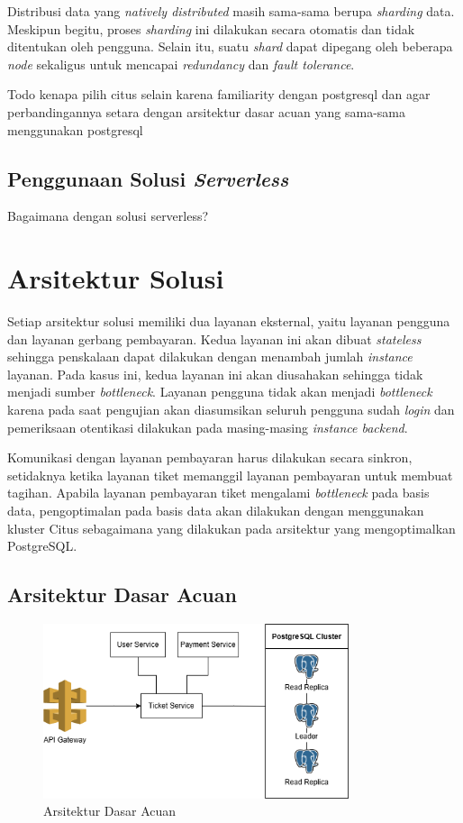 Distribusi data yang \textit{natively distributed} masih sama-sama berupa \textit{sharding} data. Meskipun begitu, proses \textit{sharding} ini dilakukan secara otomatis dan tidak ditentukan oleh pengguna. Selain itu, suatu \textit{shard} dapat dipegang oleh beberapa \textit{node} sekaligus untuk mencapai \textit{redundancy} dan \textit{fault tolerance}.

Todo kenapa pilih citus selain karena familiarity dengan postgresql dan agar perbandingannya setara dengan arsitektur dasar acuan yang sama-sama menggunakan postgresql

\subsection{Penggunaan Solusi \textit{Serverless}}

Bagaimana dengan solusi serverless?

\section{Arsitektur Solusi}

Setiap arsitektur solusi memiliki dua layanan eksternal, yaitu layanan pengguna dan layanan gerbang pembayaran. Kedua layanan ini akan dibuat \textit{stateless} sehingga penskalaan dapat dilakukan dengan menambah jumlah \textit{instance} layanan. Pada kasus ini, kedua layanan ini akan diusahakan sehingga tidak menjadi sumber \textit{bottleneck}. Layanan pengguna tidak akan menjadi \textit{bottleneck} karena pada saat pengujian akan diasumsikan seluruh pengguna sudah \textit{login} dan pemeriksaan otentikasi dilakukan pada masing-masing \textit{instance backend}.

Komunikasi dengan layanan pembayaran harus dilakukan secara sinkron, setidaknya ketika layanan tiket memanggil layanan pembayaran untuk membuat tagihan. Apabila layanan pembayaran tiket mengalami \textit{bottleneck} pada basis data, pengoptimalan pada basis data akan dilakukan dengan menggunakan kluster Citus sebagaimana yang dilakukan pada arsitektur yang mengoptimalkan PostgreSQL.

\subsection{Arsitektur Dasar Acuan}

\begin{figure}[ht]
    \centering
    \includegraphics[width=0.8\textwidth]{resources/chapter-3/architecture-reference.png}
    \caption{Arsitektur Dasar Acuan}
    \label{fig:baseline-architecture}
\end{figure}


